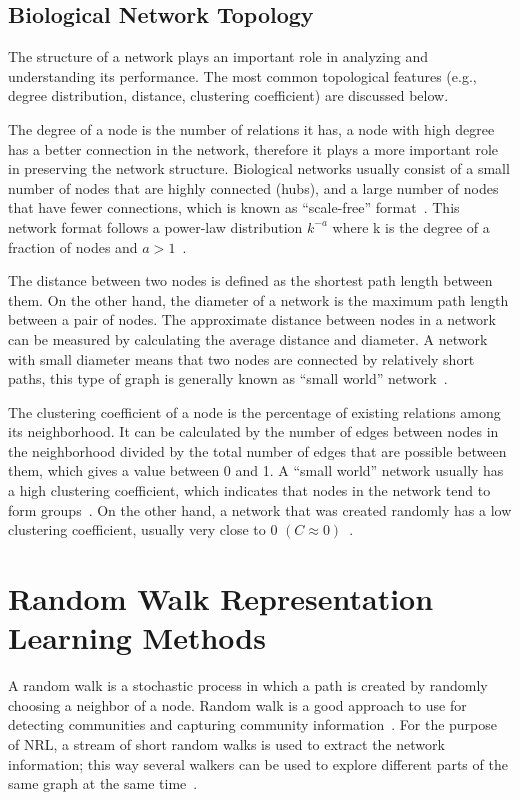 \subsection{Biological Network Topology}

The structure of a network plays an important role in analyzing and understanding its performance.
The most common topological features (e.g., degree distribution, distance, clustering coefficient) are discussed below.

The degree of a node is the number of relations it has, a node with high degree has a better connection in the network, therefore it plays a more important role in preserving the network structure.
Biological networks usually consist of a small number of nodes that are highly connected (hubs), and a large number of nodes that have fewer connections, which is known as “scale-free” format~\cite{zhu_getting_2007}.
This network format follows a power-law distribution $k^{-a}$ where k is the degree of a fraction of nodes and $a>1$~\cite{broido_scale-free_2019}.

The distance between two nodes is defined as the shortest path length between them.
On the other hand, the diameter of a network is the maximum path length between a pair of nodes.
The approximate distance between nodes in a network can be measured by calculating the average distance and diameter.
A network with small diameter means that two nodes are connected by relatively short paths, this type of graph is generally known as “small world” network~\cite{zhu_getting_2007}.

The clustering coefficient of a node is the percentage of existing relations among its neighborhood.
It can be calculated by the number of edges between nodes in the neighborhood divided by the total number of edges that are possible between them, which gives a value between 0 and 1.
A “small world” network usually has a high clustering coefficient, which indicates that nodes in the network tend to form groups~\cite{zhu_getting_2007}.
On the other hand, a network that was created randomly has a low clustering coefficient, usually very close to 0 $(C \approx 0)$~\cite{newman_random_2002}.

\section{Random Walk Representation Learning Methods}

A random walk is a stochastic process in which a path is created by randomly choosing a neighbor of a node.
Random walk is a good approach to use for detecting communities and capturing community information~\cite{perozzi_deepwalk:_2014}.
For the purpose of \ac{NRL}, a stream of short random walks is used to extract the network information; this way several walkers can be used to explore different parts of the same graph at the same time~\cite{perozzi_deepwalk:_2014}.

